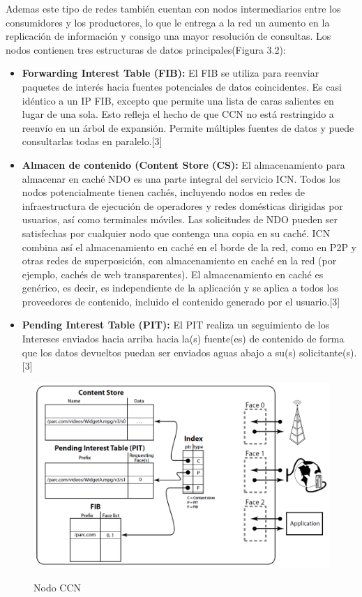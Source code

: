 \documentclass[12pt]{ociamthesis}  %
\begin{document}
Ademas este tipo de redes también cuentan con nodos intermediarios entre los consumidores y los productores, lo que le entrega a la red un aumento en la replicación de información y consigo una mayor resolución de consultas. Los nodos contienen tres estructuras de datos principales(Figura 3.2):\\

\begin{itemize}
	\item\textbf{Forwarding Interest Table (FIB):} El FIB se utiliza para reenviar paquetes de interés hacia fuentes potenciales de datos coincidentes. Es casi idéntico a un IP FIB, excepto que permite una lista de caras salientes en lugar de una sola. Esto refleja el hecho de que CCN no está restringido a reenvío en un árbol de expansión. Permite múltiples fuentes de datos y puede consultarlas todas en paralelo.[3]\\
	\item \textbf{Almacen de contenido (Content Store (CS):} El almacenamiento para almacenar en caché NDO es una parte integral del servicio ICN. Todos los nodos potencialmente tienen cachés, incluyendo nodos en redes de infraestructura de ejecución de operadores y redes domésticas dirigidas por usuarios, así como terminales móviles. Las solicitudes de NDO pueden ser satisfechas por cualquier nodo que contenga una copia en su caché. ICN combina así el almacenamiento en caché en el borde de la red, como en P2P y otras redes de superposición, con almacenamiento en caché en la red (por ejemplo, cachés de web transparentes). El almacenamiento en caché es genérico, es decir, es independiente de la aplicación y se aplica a todos los proveedores de contenido, incluido el contenido generado por el usuario.[3]\\
	\item \textbf{Pending Interest Table (PIT):} El PIT realiza un seguimiento de los Intereses enviados hacia arriba hacia la(s) fuente(es) de contenido de forma que los datos devueltos puedan ser enviados aguas abajo a su(s) solicitante(s).[3]\\
\end{itemize}

	\begin{figure}[h]
		\centering
		\includegraphics[width=12cm]{Nodo.png}\\
		\caption{Nodo CCN}
		\label{fig:mesh1}
	\end{figure}
	
\end{document}
